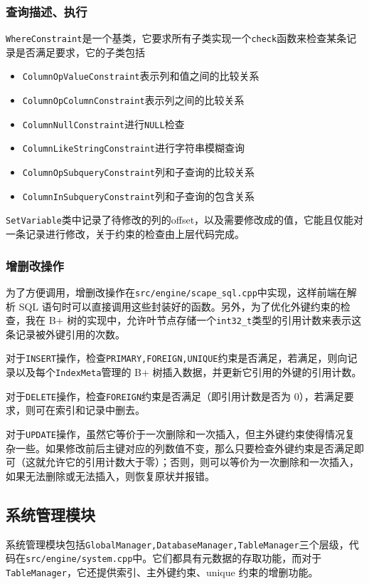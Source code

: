 \documentclass{ctexart}
\begin{document}
\subsubsection{查询描述、执行}
\texttt{WhereConstraint}是一个基类，它要求所有子类实现一个\texttt{check}函数来检查某条记录是否满足要求，它的子类包括
\begin{itemize}
	\item \texttt{ColumnOpValueConstraint}表示列和值之间的比较关系
	\item \texttt{ColumnOpColumnConstraint}表示列之间的比较关系
	\item \texttt{ColumnNullConstraint}进行\texttt{NULL}检查
	\item \texttt{ColumnLikeStringConstraint}进行字符串模糊查询
	\item \texttt{ColumnOpSubqueryConstraint}列和子查询的比较关系
	\item \texttt{ColumnInSubqueryConstraint}列和子查询的包含关系
\end{itemize}

\texttt{SetVariable}类中记录了待修改的列的offset，以及需要修改成的值，它能且仅能对一条记录进行修改，关于约束的检查由上层代码完成。

\subsubsection{增删改操作}
为了方便调用，增删改操作在\texttt{src/engine/scape\_sql.cpp}中实现，这样前端在解析 SQL 语句时可以直接调用这些封装好的函数。另外，为了优化外键约束的检查，我在 B+ 树的实现中，允许叶节点存储一个\texttt{int32\_t}类型的引用计数来表示这条记录被外键引用的次数。

对于\texttt{INSERT}操作，检查\texttt{PRIMARY,FOREIGN,UNIQUE}约束是否满足，若满足，则向记录以及每个\texttt{IndexMeta}管理的 B+ 树插入数据，并更新它引用的外键的引用计数。

对于\texttt{DELETE}操作，检查\texttt{FOREIGN}约束是否满足（即引用计数是否为 0），若满足要求，则可在索引和记录中删去。

对于\texttt{UPDATE}操作，虽然它等价于一次删除和一次插入，但主外键约束使得情况复杂一些。如果修改前后主键对应的列数值不变，那么只要检查外键约束是否满足即可（这就允许它的引用计数大于零）；否则，则可以等价为一次删除和一次插入，如果无法删除或无法插入，则恢复原状并报错。

\subsection{系统管理模块}
系统管理模块包括\texttt{GlobalManager,DatabaseManager,TableManager}三个层级，代码在\texttt{src/engine/system.cpp}中。它们都具有元数据的存取功能，而对于\texttt{TableManager}，它还提供索引、主外键约束、unique 约束的增删功能。
\end{document}

